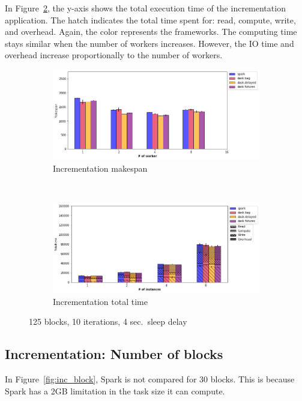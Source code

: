 \documentclass[conference]{IEEEtran}
\begin{document}
In Figure~\ref{fig:inc_tt_worker}, the y-axis shows the total execution time of the
incrementation application. The hatch indicates the total time spent for: read,
compute, write, and overhead. Again, the color represents the frameworks. The
computing time stays similar when the number of workers increases. However, the IO
time and overhead increase proportionally to the number of workers.

\begin{figure}[!b]
    \centering
    \begin{subfigure}[b]{\columnwidth}
        \includegraphics[clip,width=\columnwidth]{images/inc_worker.png}%
        \caption{Incrementation makespan}\label{fig:inc_ms_worker}
    \end{subfigure}
    \\
    \begin{subfigure}[b]{\columnwidth}
        \includegraphics[clip,width=\columnwidth]{images/inc_idle_worker.png}%
        \caption{Incrementation total time}\label{fig:inc_tt_worker}
    \end{subfigure}
    \caption{125 blocks, 10 iterations, 4 sec.\ sleep delay}\label{fig:inc_worker}
\end{figure}

\subsection{Incrementation: Number of blocks}
In Figure~\ref{fig:inc_block}, Spark is not compared for 30 blocks. This is because
Spark has a 2GB limitation in the task size it can compute.
\end{document}
